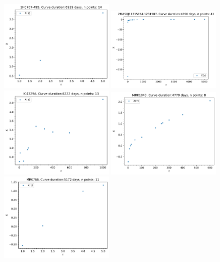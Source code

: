 \begin{figure}
\begin{center}
    {
  \includegraphics[width=0.49\textwidth]{Figs/Chapter5/X_tau_1H0707-495.pdf}  \hfill
  \includegraphics[width=0.49\textwidth]{Figs/Chapter5/X_tau_2MASXJ11315154-1231587.pdf} \\
  \includegraphics[width=0.49\textwidth]{Figs/Chapter5/X_tau_IC4329A.pdf} \hfill 
  \includegraphics[width=0.49\textwidth]{Figs/Chapter5/X_tau_MRK1040.pdf}  \\ 
  \includegraphics[width=0.49\textwidth]{Figs/Chapter5/X_tau_MRK766.pdf}  \hfill
}
\end{center}
\end{figure}
